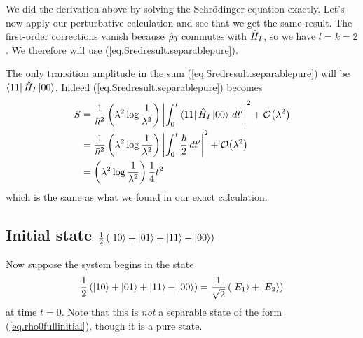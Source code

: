 We did the derivation above by solving the Schr\"odinger equation exactly. Let's now apply our perturbative calculation and see that we get the same result. 
The first-order corrections vanish because \(\hat{\rho}_0\) commutes with \(\hat{H}_I\), so we have \(l=k=2\). We therefore will use (\ref{eq.Sredresult.separablepure}).

The only transition amplitude in the sum (\ref{eq.Sredresult.separablepure}) will be \(\left\langle11\right| \hat{H}_I \left|00\right\rangle\). Indeed (\ref{eq.Sredresult.separablepure}) becomes
\begin{align*}
S &= \frac{1}{\hbar^2} \left(\lambda^2 \log \frac{1}{\lambda^2}\right) \left|\int_0^t \left\langle11\right| \hat{H}_I \left|00\right\rangle\,dt^\prime\right|^2 + \mathcal{O}{\left(\lambda^2\right)} \\
&= \frac{1}{\hbar^2} \left(\lambda^2 \log \frac{1}{\lambda^2}\right) \left|\int_0^t \frac{\hbar}{2}\,dt^\prime\right|^2 + \mathcal{O}{\left(\lambda^2\right)} \\
&= \left(\lambda^2 \log \frac{1}{\lambda^2}\right) \frac{1}{4} t^2
\end{align*}
which is the same as what we found in our exact calculation.

\subsection{Initial state \(\frac{1}{2}\left(\left|10\right\rangle + \left|01\right\rangle + \left|11\right\rangle - \left|00\right\rangle\right)\)}

Now suppose the system begins in the state
\[\frac{1}{2}\left(\left|10\right\rangle + \left|01\right\rangle + \left|11\right\rangle - \left|00\right\rangle\right) = \frac{1}{\sqrt{2}} \left(\left|E_1\right\rangle + \left|E_2\right\rangle\right)\]
at time \(t=0\). Note that this is \emph{not} a separable state of the form (\ref{eq.rho0fullinitial}), though it is a pure state.

